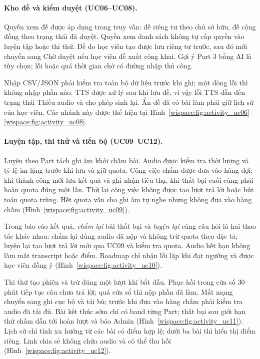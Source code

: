 \paragraph{Kho đề và kiểm duyệt (UC06--UC08).}
Quyền xem đề được áp dụng trong truy vấn: đề riêng tư theo chủ sở hữu, đề cộng đồng theo trạng thái đã duyệt. Quyền xem danh sách không tự cấp quyền vào luyện tập hoặc thi thử. Đề do học viên tạo được lưu riêng tư trước, sau đó mới chuyển sang Chờ duyệt nếu học viên đề xuất công khai. Gợi ý Part 3 bằng AI là tùy chọn; lỗi hoặc quá thời gian chờ có đường nhập thủ công.

Nhập CSV/JSON phải kiểm tra toàn bộ dữ liệu trước khi ghi; một dòng lỗi thì không nhập phần nào. TTS được xử lý sau khi lưu đề, vì vậy lỗi TTS dẫn đến trạng thái Thiếu audio và cho phép sinh lại. Ẩn đề đã có bài làm phải giữ lịch sử của học viên. Các nhánh này được thể hiện tại Hình~\ref{wispace:fig:activity_uc06}--\ref{wispace:fig:activity_uc08}.

\paragraph{Luyện tập, thi thử và tiến bộ (UC09--UC12).}
Luyện theo Part tách ghi âm khỏi chấm bài. Audio được kiểm tra thời lượng và tỷ lệ im lặng trước khi lưu và giữ quota. Công việc chấm được đưa vào hàng đợi; khi thành công mới lưu kết quả và ghi nhận tiêu thụ, khi thất bại cuối cùng phải hoàn quota đúng một lần. Thử lại công việc không được tạo lượt trả lời hoặc bút toán quota trùng. Hết quota vẫn cho ghi âm tự nghe nhưng không đưa vào hàng chấm (Hình~\ref{wispace:fig:activity_uc09}).

Trong báo cáo kết quả, \textit{chấm lại} bài thất bại và \textit{luyện lại} cùng câu hỏi là hai thao tác khác nhau: chấm lại dùng audio đã nộp và không trừ quota theo đặc tả; luyện lại tạo lượt trả lời mới qua UC09 và kiểm tra quota. Audio hết hạn không làm mất transcript hoặc điểm. Roadmap chỉ nhận lỗi lặp khi đạt ngưỡng và được học viên đồng ý (Hình~\ref{wispace:fig:activity_uc10}).

Thi thử tạo phiên và trừ đúng một lượt khi bắt đầu. Phục hồi trong cửa sổ 30 phút tiếp tục câu chưa trả lời; quá cửa sổ thì nộp phần đã làm. Mất mạng chuyển sang ghi cục bộ và tải bù; trước khi đưa vào hàng chấm phải kiểm tra audio đã tải đủ. Bài kết thúc sớm chỉ có band từng Part; thất bại sau giới hạn thử chấm dẫn tới hoàn lượt và báo Admin (Hình~\ref{wispace:fig:activity_uc11}). Lịch sử chỉ tính xu hướng từ các bài có điểm hợp lệ; dưới ba bài thì hiển thị điểm riêng. Link chia sẻ không chứa audio và có thể thu hồi (Hình~\ref{wispace:fig:activity_uc12}).

